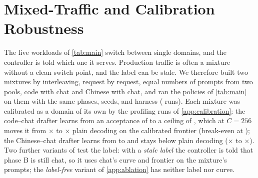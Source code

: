 \section{Mixed-Traffic and Calibration Robustness}\label{app:mix}

The live workloads of \cref{tab:main} switch between single domains, and the controller is told which one it serves. Production traffic is often a mixture without a clean switch point, and the label can be stale. We therefore built two mixtures by interleaving, request by request, equal numbers of prompts from two pools, code with chat and Chinese with chat, and ran the policies of \cref{tab:main} on them with the same phases, seeds, and harness ( runs). Each mixture was calibrated as a domain of its own by the profiling runs of \cref{app:calibration}: the code--chat drafter learns from an acceptance of  to a ceiling of , which at $C{=}256$ moves it from $\times$ to $\times$ plain decoding on the calibrated frontier (break-even at ); the Chinese--chat drafter learns from  to  and stays below plain decoding ($\times$ to $\times$). Two further variants of  test the label: with a \emph{stale label} the controller is told that phase B is still chat, so it uses chat's curve and frontier on the mixture's prompts; the \emph{label-free} variant of \cref{app:ablation} has neither label nor curve.

